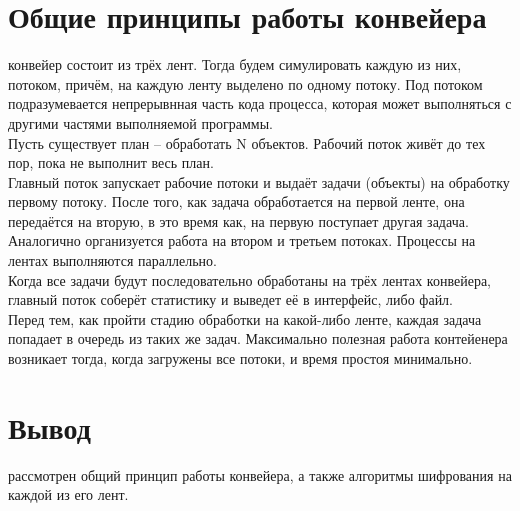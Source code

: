 \section{Общие принципы работы конвейера}
 конвейер состоит из трёх лент. Тогда будем симулировать каждую из них, потоком, причём, на каждую ленту выделено по одному потоку.
Под потоком подразумевается непрерывнная часть кода процесса, которая может выполняться с другими частями выполняемой программы.\\

Пусть существует план -- обработать N объектов. Рабочий поток живёт до тех пор, пока не выполнит весь план.\\

Главный поток запускает рабочие потоки и выдаёт задачи (объекты) на обработку первому потоку. После того, как задача обработается на первой ленте, она передаётся на вторую, в это время как, на первую поступает другая задача. Аналогично организуется работа на втором и третьем потоках. Процессы на лентах выполняются параллельно.\\

Когда все задачи будут последовательно обработаны на трёх лентах конвейера, главный поток соберёт статистику и выведет её в интерфейс, либо файл.\\

Перед тем, как пройти стадию обработки на какой-либо ленте, каждая задача попадает в очередь из таких же задач. Максимально полезная работа контейенера возникает тогда, когда загружены все потоки, и время простоя минимально.

\section*{Вывод}
 рассмотрен общий принцип работы конвейера, а также алгоритмы шифрования на каждой из его лент.